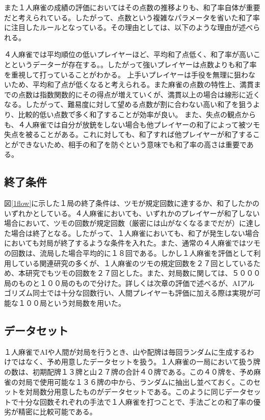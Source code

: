 また１人麻雀の成績の評価においてはその点数の推移よりも、和了率自体が重要だと考えられている。したがって、点数という複雑なパラメータを省いた和了率に注目したルールとなっている。その理由としては、以下のような理由が述べられる。

４人麻雀では平均順位の低いプレイヤーほど、平均和了点低く、和了率が高いことというデーターが存在する。\cite{kagaku}。したがって強いプレイヤーは点数よりも和了率を重視して打っていることがわかる。
上手いプレイヤーは手役を無理に狙わないため、平均和了点が低くなると考えられる。また麻雀の点数の特性上、満貫までの点数は指数関数的にその得点が増えていくが、満貫以上の場合は線形に近くなる。したがって、難易度に対して望める点数が割に合わない高い和了を狙うより、比較的低い点数で゙多く和了することが効率が良い。
また、失点の観点からも、４人麻雀では自分が放銃をしない場合も他プレイヤーの和了によって被ツモ失点を被ることがある。これに対しても、和了すれば他プレイヤーが和了することができないため、相手の和了を防ぐという意味でも和了率の高さは重要である。

\subsection{終了条件}
図\ref{1flow}に示した１局の終了条件は、ツモが規定回数に達するか、和了したかのいずれかとしている。４人麻雀においても、いずれかのプレイヤーが和了しない場合において、ツモの回数が規定回数（厳密には山がなくなるまでだが）に達した場合は終了となる。したがって、１人麻雀においても、和了が発生しない場合においても対局が終了するような条件を入れた。また、通常の４人麻雀ではツモの回数は、流局した場合平均的に１８回である。しかし１人麻雀を評価として利用している関連研究の多く\cite{zentsu}\cite{bakuuti2013}が、１人麻雀のツモの規定回数を２７回としているため、本研究でもツモの回数を２７回とした。また、対局数に関しては、５０００局のものと１００局のもので分けた。詳しくは次章の評価で述べるが、AIアルゴリズム同士では十分な回数行い、人間プレイヤーも評価に加える際は実現が可能な１００局という対局数を用いた。

\subsection{データセット}
１人麻雀でAIや人間が対局を行うとき、山や配牌は毎回ランダムに生成するわけではなく、予め用意したデータセットを扱う。１人麻雀の一局において扱う牌の数は、初期配牌１３牌と山２７牌の合計４０牌である。この４０牌を、予め麻雀の対局で使用可能な１３６牌の中から、ランダムに抽出し並べておく。このセットを対局数分用意したものがデータセットである。このように同じデータセットで十分な回数それぞれの手法で１人麻雀を打つことで、手法ごとの和了率の優劣が精密に比較可能である。

